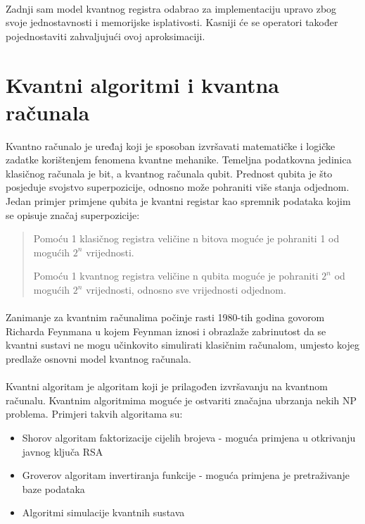 \documentclass[times, utf8, zavrsni, numeric]{fer}
\begin{document}
\paragraph{}
Zadnji sam model kvantnog registra odabrao za implementaciju upravo zbog svoje jednostavnosti i memorijske isplativosti. Kasniji će se operatori također pojednostaviti zahvaljujući ovoj aproksimaciji.

\section{Kvantni algoritmi i kvantna računala}
Kvantno računalo je uređaj koji je sposoban izvršavati matematičke i logičke zadatke korištenjem fenomena kvantne mehanike. Temeljna podatkovna jedinica klasičnog računala je bit, a kvantnog računala qubit. Prednost qubita je što posjeduje svojstvo superpozicije, odnosno može pohraniti više stanja odjednom. Jedan primjer primjene qubita je kvantni registar kao spremnik podataka kojim se opisuje značaj superpozicije:
\begin{quote}
Pomoću 1 klasičnog registra veličine n bitova moguće je pohraniti 1 od mogućih $2^n$ vrijednosti.

Pomoću 1 kvantnog registra veličine n qubita moguće je pohraniti $2^n$ od mogućih $2^n$ vrijednosti, odnosno sve vrijednosti odjednom.
\end{quote}

\paragraph{}
Zanimanje za kvantnim računalima počinje rasti 1980-tih godina govorom Richarda Feynmana u kojem Feynman iznosi i obrazlaže zabrinutost da se kvantni sustavi ne mogu učinkovito simulirati klasičnim računalom, umjesto kojeg predlaže osnovni model kvantnog računala. \citep{q_history}

\paragraph{}
Kvantni algoritam je algoritam koji je prilagođen izvršavanju na kvantnom računalu. Kvantnim algoritmima moguće je ostvariti značajna ubrzanja nekih NP problema. \cite{qga_apply} \citep{han_phd} Primjeri takvih algoritama su:
\begin{itemize}
\item Shorov algoritam faktorizacije cijelih brojeva - moguća primjena u otkrivanju javnog ključa RSA
\item Groverov algoritam invertiranja funkcije - moguća primjena je pretraživanje baze podataka
\item Algoritmi simulacije kvantnih sustava
\end{itemize}
\end{document}
